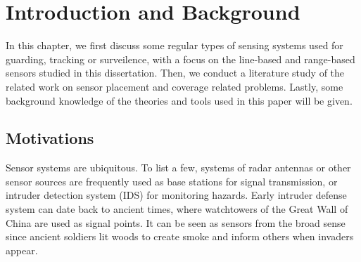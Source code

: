 
\chapter{Introduction and Background} 
\thispagestyle{myheadings} 
In this chapter, we first discuss some regular types of sensing systems 
used for guarding, tracking or surveilence, 
with a focus on the line-based and range-based sensors studied in this dissertation. 
Then, we conduct a literature study of the related work on sensor placement and 
coverage related problems. 
Lastly, some background knowledge of the theories and tools used in this paper will be given. 
\section{Motivations} 
Sensor systems are ubiquitous. To list a few, systems of radar antennas 
or other sensor sources are frequently used as base stations for signal transmission, 
or intruder detection system (IDS) for monitoring hazards. 
Early intruder defense system can date back to ancient times, where 
watchtowers of the Great Wall of China are used as signal points. 
It can be seen as sensors from the broad sense 
since ancient soldiers lit woods to create smoke and inform others when invaders appear. 
